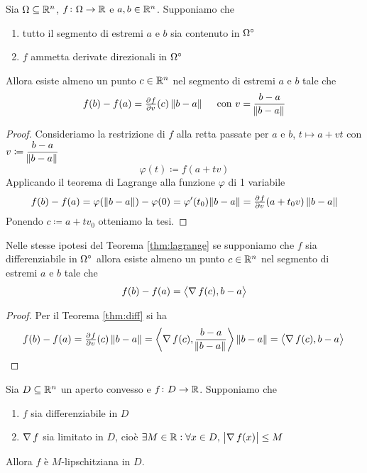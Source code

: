 \begin{thm} \label{thm:lagrange}
	Sia $ \Omega \subseteq \mathbb{R}^n $, $ f \colon \Omega \to \mathbb{R} $ e $ a, b \in \mathbb{R}^n $. Supponiamo che 
	\begin{enumerate}[label = (\roman*)]
		\item tutto il segmento di estremi $ a $ e $ b $ sia contenuto in $ {\Omega}^{\circ} $
		\item $ f $ ammetta derivate direzionali in $ {\Omega}^{\circ} $
	\end{enumerate}
	Allora esiste almeno un  punto $ c \in \mathbb{R}^n $ nel segmento di estremi $ a $ e $ b $ tale che 
	\begin{equation}
		f(b) - f(a) = \pd{f}{v}(c) \, \norm{b - a}  \quad \text{ con } v = \frac{b - a}{\norm{b - a}}
	\end{equation}
\end{thm}
%
\begin{proof}
	Consideriamo la restrizione di $ f $ alla retta passate per $ a $ e $ b $, $ t \mapsto a + v t $ con $ v \coloneqq \dfrac{b - a}{\norm{b - a}} $ 
	\[
		\varphi(t) \coloneqq f(a + tv)
	\]
	Applicando il teorema di Lagrange alla funzione $ \varphi $ di 1 variabile
	\[
		f(b) - f(a) = \varphi(\,\norm{b - a}) - \varphi(0) = \varphi'(t_0) \norm{b - a} = \pd{f}{v}(a + t_0v) \, \norm{b - a}
	\]
	Ponendo $ c \coloneqq a + t v_0 $ otteniamo la tesi. 
\end{proof}

\begin{corollary} \label{cor:lagrange}
	Nelle stesse ipotesi del Teorema \ref{thm:lagrange} se supponiamo che $ f $ sia differenziabile in $ {\Omega}^{\circ} $ allora esiste almeno un  punto $ c \in \mathbb{R}^n $ nel segmento di estremi $ a $ e $ b $ tale che 
	\begin{equation}
		f(b) - f(a) = \left\langle \operatorname{\nabla}{f}(c), b - a \right\rangle
	\end{equation}
\end{corollary}
%
\begin{proof}
	Per il Teorema \ref{thm:diff} si ha
	\[
		f(b) - f(a) = \pd{f}{v}(c) \, \norm{b - a} = \sp{\grad{f}(c)}{\frac{b - a}{\norm{b - a}}} \, \norm{b - a} = \sp{\grad{f}(c)}{b - a} \qedhere
	\]
\end{proof}

\begin{prop}
	Sia $ D \subseteq \mathbb{R}^n $ un aperto convesso e $ f \colon D \to \mathbb{R} $. Supponiamo che 
	\begin{enumerate}[label = (\roman*)]
		\item $ f $ sia differenziabile in $ D $
		\item $ \operatorname{\nabla}{f} $ sia limitato in $ D $, cioè $ \exists M \in \R : \forall x \in D, \ \abs{\grad{f}(x)} \leq M $
	\end{enumerate}
	Allora $ f $ è $ M $-lipschitziana in $ D $.
\end{prop}

